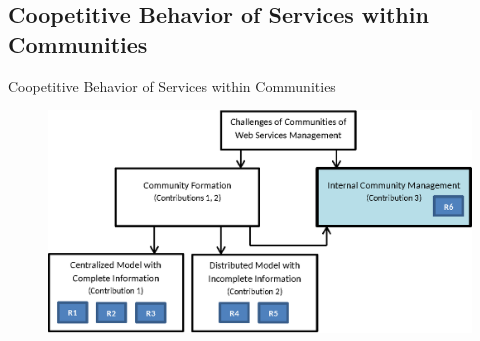 \documentclass{beamer}
\begin{document}
\subsection{Coopetitive Behavior of Services within Communities}
\begin{frame}{Coopetitive Behavior of Services within Communities}
    \begin{figure}[htbp]
        \centering
        \includegraphics[width=0.9 \columnwidth]{figures/model_c3.eps}
    \end{figure}
\end{frame}
\end{document}
